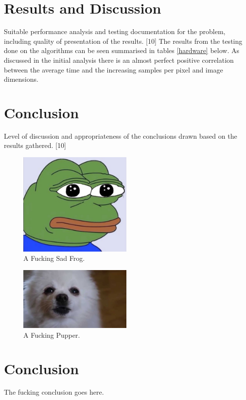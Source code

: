 \documentclass[journal,transmag]{IEEEtran}
\begin{document}
	\section{Results and Discussion}
	Suitable performance analysis and testing documentation
	for the problem, including quality of presentation of
	the results. [10]
	The results from the testing done on the algorithms can be seen summarised in tables \ref{hardware} below. As discussed in the initial analysis there is an almost perfect positive correlation between the average time and the increasing samples per pixel and image dimensions.
	
	\section{Conclusion}
	Level of discussion and appropriateness of the conclusions
	drawn based on the results gathered. [10]
	
	\begin{figure}[!h]
		\centering
		\includegraphics[width= 0.5\textwidth]{IMAGES/exampleImage}
		\caption{A Fucking Sad Frog.}
		\label{fig_frog}
	\end{figure}
	
	\begin{figure}[!h]
		\centering
		\includegraphics[width= 0.5\textwidth]{IMAGES/fig2}
		\caption{A Fucking Pupper.}
		\label{fig_pup}
	\end{figure}
	
	\section{Conclusion}
	The fucking conclusion goes here.
	
\end{document}
